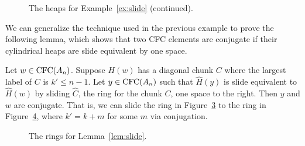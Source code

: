 \begin{example}
\begin{figure}[H]
\begin{subfigure}{0.3\textwidth}
\caption{}\label{fig:slideexheap4.3}
\end{subfigure}
\caption{The heaps for Example~\ref{ex:slide} (continued).}\label{fig:slideex}
\end{figure}
\end{example}

    We can generalize the technique used in the previous example to prove the following lemma, which shows that two CFC elements are conjugate if their cylindrical heaps are slide equivalent by one space.
    
\begin{lemma}\label{lem:slide}
Let $w \in \operatorname{\mathrm{CFC}}(A_n)$. Suppose $H(w)$ has a diagonal chunk $C$ where the largest label of $C$ is $k' \leq n-1$.
    Let $y \in \operatorname{\mathrm{CFC}}(A_n)$ such that $\hat{H}(y)$ is slide equivalent to $\hat{H}(w)$ by sliding $\hat{C}$, the ring for the chunk $C$, one space to the right. Then $y$ and $w$ are conjugate.
    That is, we can slide the ring in Figure~\ref{fig:slide1} to the ring in Figure~\ref{fig:slide2}, where $k' = k+m$ for some $m$ via conjugation.
\end{lemma}

\begin{center} \begin{figure}[H] \centering
\begin{subfigure}{0.3\textwidth} \centering
{}
\caption{}\label{fig:slide1}
\end{subfigure}
\begin{subfigure}{0.3\textwidth} \centering
{}
\caption{}\label{fig:slide2}
\end{subfigure}
\caption{The rings for Lemma~\ref{lem:slide}.}\label{fig:slidelemma}
\end{figure} \end{center}

